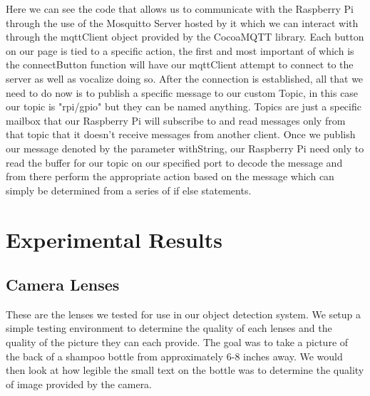 \documentclass[letterpaper,12pt]{article}
\begin{document}
    Here we can see the code that allows us to communicate with the Raspberry Pi through the use of the Mosquitto Server hosted by it which we can interact with through the mqttClient object provided by the CocoaMQTT library. Each button on our page is tied to a specific action, the first and most important of which is the connectButton function will have our mqttClient attempt to connect to the server as well as vocalize doing so. After the connection is established, all that we need to do now is to publish a specific message to our custom Topic, in this case our topic is "rpi/gpio" but they can be named anything. Topics are just a specific mailbox that our Raspberry Pi will subscribe to and read messages only from that topic that it doesn't receive messages from another client. Once we publish our message denoted by the parameter withString, our Raspberry Pi need only to read the buffer for our topic on our specified port to decode the message and from there perform the appropriate action based on the message which can simply be determined from a series of if else statements. 


\section{Experimental Results}
\subsection{Camera Lenses}


\medskip

These are the lenses we tested for use in our object detection system. We setup a simple testing environment to determine the quality of each lenses and the quality of the picture they can each provide. The goal was to take a picture of the back of a shampoo bottle from approximately 6-8 inches away. We would then look at how legible the small text on the bottle was to determine the quality of image provided by the camera.\par

\end{document}
